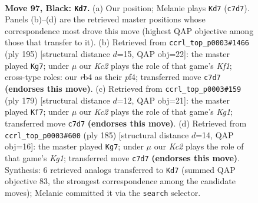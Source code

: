 \documentclass[11pt]{article}
\begin{document}
\clearpage

\begin{figure}[p]\centering
\begin{subfigure}{0.46\textwidth}\centering
\resizebox{\linewidth}{!}{%
\newchessgame
\chessboard[
  setfen={8/2k5/4pp1R/8/1R2P3/5PK1/8/r7 b - - 7 97},
  showmover=false,
  pgfstyle=straightmove, color=movearrow, markmove={c7-d7}
]}
\caption{}
\end{subfigure}\hfill
\begin{subfigure}{0.46\textwidth}\centering
\resizebox{\linewidth}{!}{%
\newchessgame
\chessboard[
  setfen={5k2/3R1p2/4p3/4P1P1/5P1K/r7/8/8 b - - 12 98},
  showmover=false,
  pgfstyle=straightmove, color=movearrow, markmove={f8-g7}
]}
\caption{}
\end{subfigure}
\\[4pt]
\begin{subfigure}{0.46\textwidth}\centering
\resizebox{\linewidth}{!}{%
\newchessgame
\chessboard[
  setfen={6k1/8/4R1p1/6P1/5K1P/8/8/r7 b - - 70 90},
  showmover=false,
  pgfstyle=straightmove, color=movearrow, markmove={g8-f7}
]}
\caption{}
\end{subfigure}\hfill
\begin{subfigure}{0.46\textwidth}\centering
\resizebox{\linewidth}{!}{%
\newchessgame
\chessboard[
  setfen={6k1/2R2p2/8/6P1/5PK1/8/r7/8 b - - 4 93},
  showmover=false,
  pgfstyle=straightmove, color=movearrow, markmove={g8-g7}
]}
\caption{}
\end{subfigure}
\caption{\textbf{Move 97, Black: \texttt{Kd7}.} (a) Our position; Melanie plays \texttt{Kd7} (\texttt{c7d7}). Panels (b)--(d) are the retrieved master positions whose correspondence most drove this move (highest QAP objective among those that transfer to it). (b) Retrieved from \texttt{ccrl\_top\_p0003\#1466} (ply 195) [structural distance $d$=15, QAP obj=22]: the master played \texttt{Kg7}; under $\mu$ our \emph{Kc2} plays the role of that game's \emph{Kf1}; cross-type roles: our \emph{r}b4 as their \emph{p}f4; transferred move \texttt{c7d7} \textbf{(endorses this move)}. (c) Retrieved from \texttt{ccrl\_top\_p0003\#159} (ply 179) [structural distance $d$=12, QAP obj=21]: the master played \texttt{Kf7}; under $\mu$ our \emph{Kc2} plays the role of that game's \emph{Kg1}; transferred move \texttt{c7d7} \textbf{(endorses this move)}. (d) Retrieved from \texttt{ccrl\_top\_p0003\#600} (ply 185) [structural distance $d$=14, QAP obj=16]: the master played \texttt{Kg7}; under $\mu$ our \emph{Kc2} plays the role of that game's \emph{Kg1}; transferred move \texttt{c7d7} \textbf{(endorses this move)}. Synthesis: 6 retrieved analogs transferred to \texttt{Kd7} (summed QAP objective 83, the strongest correspondence among the candidate moves); Melanie committed it via the \texttt{search} selector.}
\label{fig:thought-m193}
\end{figure}
\end{document}
